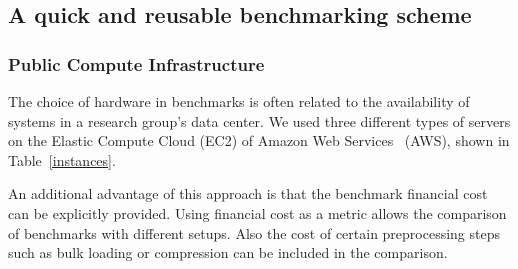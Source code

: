 \documentclass[twocolumn]{bmcart}%
\begin{document}
\subsection{A quick and reusable benchmarking scheme}
\label{subsec:bmscheme}
%


%

\subsubsection{Public Compute Infrastructure}

The choice of hardware in benchmarks is often related to the availability of systems in a research group's data center.
We used three different types of servers on the Elastic Compute Cloud (EC2) of Amazon Web Services~\cite{ec2} (AWS), shown in Table~\ref{instances}. 

\begin{table}[ht!]
	\centering
	\caption{Instance types used in benchmarks and their purpose.}
	\label{instances}
\end{table}

An additional advantage of this approach is that the benchmark financial cost can be explicitly provided. Using financial cost as a metric allows the comparison of benchmarks with different setups. Also the cost of certain preprocessing steps such as bulk loading or compression can be included in the comparison.
\end{document}
